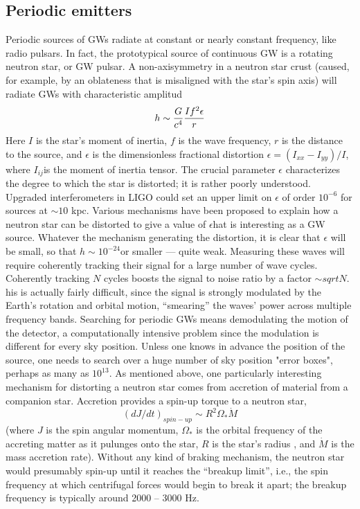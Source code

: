 \documentclass[binding=0.6cm, LaM]{sapthesis}
\begin{document}
\subsection{Periodic emitters}
Periodic sources of GWs radiate at constant or nearly constant frequency, like radio pulsars.
In fact, the prototypical source of continuous GW is a rotating neutron star, or GW pulsar. A non-axisymmetry in a neutron star crust (caused, for example, by an oblateness that is misaligned with
the star’s spin axis) will radiate GWs with characteristic amplitud
\begin{equation}
 h \sim {G \over c^4}{{If^2\epsilon}\over{r}}
\end{equation}
Here $I$ is the star's moment of inertia, $f$ is the wave frequency, $r$ is the distance to the source, and $\epsilon$ is the dimensionless fractional distortion $\epsilon = (I_{xx}-I_{yy})/I$,
where $I_{ij}$is the moment of inertia tensor. The crucial parameter $\epsilon$ characterizes the degree to which the star is distorted; it is rather poorly understood.
Upgraded interferometers in LIGO could set an upper limit on  $\epsilon$ of order $10^{-6}$ for sources at $\sim10$ kpc.
Various mechanisms have been proposed to explain how a neutron star can be distorted to give a value of $\epsilon$hat is interesting as a GW source.
Whatever the mechanism generating the distortion, it is clear that  $\epsilon$ will be small,
so that $h \sim 10^{-24}$or smaller — quite weak. Measuring these waves will require
coherently tracking their signal for a large number of wave cycles. Coherently tracking $N$ cycles boosts the signal to noise ratio by a factor $\sim sqrt{N}$.
his is actually fairly
 difficult, since the signal is strongly modulated by the Earth’s rotation and orbital
motion, “smearing” the waves’ power across multiple frequency bands. Searching for
periodic GWs means demodulating the motion of the detector, a computationally
intensive problem since the modulation is different for every sky position. Unless
one knows in advance the position of the source, one needs to search over a huge number of sky position "error boxes", perhaps as many as $10^13$.
As mentioned above, one particularly interesting mechanism for distorting a neutron star comes from accretion of material from a companion star. Accretion provides a spin-up torque to a neutron star,
\begin{equation}
(dJ/dt)_{spin-up} \sim R^2\Omega_* \dot M
\end{equation}
(where $J$  is the spin angular momentum, $\Omega_* $ is the orbital frequency of the accreting matter as it pulunges onto the star, $R$ is the star's radius , and $\dot M$
is the mass accretion rate).
Without any kind of braking mechanism, the neutron star would presumably spin-up until it reaches the “breakup limit”, i.e., the spin frequency at which centrifugal forces would begin to break it
apart; the breakup frequency is typically around 2000 – 3000 Hz.
\end{document}
